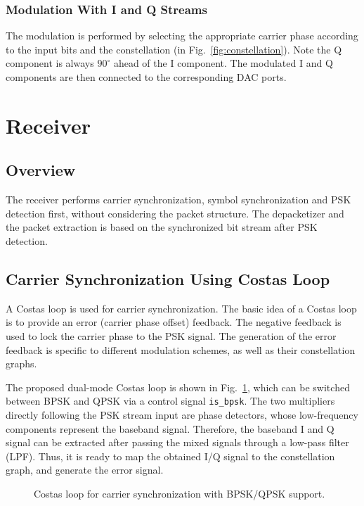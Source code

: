 \documentclass[journal,twoside]{IEEEtran}
\begin{document}
    \subsubsection{Modulation With I and Q Streams}

      The modulation is performed by selecting the appropriate carrier phase
      according to the input bits and the constellation (in Fig.~\ref{fig:constellation}).
      Note the Q component is always $90^\circ$ ahead of the I component.
      The modulated I and Q components are then connected to the corresponding DAC ports.

  \section{Receiver}

    \subsection{Overview}

      The receiver performs carrier synchronization, symbol synchronization and PSK detection first,
      without considering the packet structure.
      The depacketizer and the packet extraction is based on the synchronized bit stream after PSK detection.

    \subsection{Carrier Synchronization Using Costas Loop}\label{subsec:costas}

      A Costas loop \cite{simon1977optimum} is used for carrier synchronization.
      The basic idea of a Costas loop is to provide an error (carrier phase offset) feedback.
      The negative feedback is used to lock the carrier phase to the PSK signal.
      The generation of the error feedback is specific to different modulation schemes,
      as well as their constellation graphs.

      The proposed dual-mode Costas loop is shown in Fig.~\ref{fig:costas_loop},
      which can be switched between BPSK and QPSK via a control signal \texttt{is\_bpsk}.
      The two multipliers directly following the PSK stream input are phase detectors,
      whose low-frequency components represent the baseband signal.
      Therefore, the baseband I and Q signal can be extracted after passing the mixed signals through a low-pass filter (LPF).
      Thus, it is ready to map the obtained I/Q signal to the constellation graph,
      and generate the error signal.
      \begin{figure}[htbp]
        \centering
        
        \caption{Costas loop for carrier synchronization with BPSK/QPSK support.}
        \label{fig:costas_loop}
      \end{figure}
\end{document}

